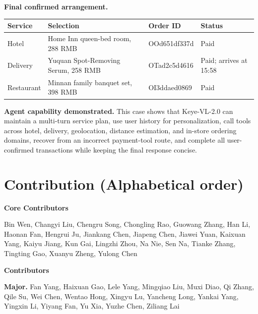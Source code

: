 \documentclass{llmxive}
\begin{document}
\begin{caseresponse}
\textbf{Final confirmed arrangement.}
\begin{center}
\begin{tabular}{llll}
\toprule
\textbf{Service} & \textbf{Selection} & \textbf{Order ID} & \textbf{Status} \\
\midrule
Hotel & Home Inn queen-bed room, 288 RMB & OOd651df337d & Paid \\
Delivery & Yuquan Spot-Removing Serum, 258 RMB & OTad2c5d4616 & Paid; arrives at 15:58 \\
Restaurant & Minnan family banquet set, 398 RMB & OI3ddaed0869 & Paid \\
\bottomrule
\end{tabular}
\end{center}

\textbf{Agent capability demonstrated.} This case shows that Keye-VL-2.0 can maintain a multi-turn service plan, use user history for personalization, call tools across hotel, delivery, geolocation, distance estimation, and in-store ordering domains, recover from an incorrect payment-tool route, and complete all user-confirmed transactions while keeping the final response concise.
\end{caseresponse}

\label{fig:multi_domain_service_agent_case}





\section{Contribution (Alphabetical order)}

\medskip
\noindent\textbf{Core Contributors}\par
\bigskip

Bin Wen, Changyi Liu, Chengru Song, Chongling Rao, Guowang Zhang,
Han Li, Haonan Fan, Hengrui Ju, Jiankang Chen, Jiapeng Chen,
Jiawei Yuan, Kaixuan Yang, Kaiyu Jiang, Kun Gai, Lingzhi Zhou,
Na Nie, Sen Na, Tianke Zhang, Tingting Gao, Xuanyu Zheng, Yulong Chen

\bigskip
\noindent\textbf{Contributors}\par
\bigskip

\textbf{Major.  }
Fan Yang, Haixuan Gao, Lele Yang, Mingqiao Liu, Muxi Diao, Qi Zhang,
Qile Su, Wei Chen, Wentao Hong, Xingyu Lu, Yancheng Long,
Yankai Yang, Yingxin Li, Yiyang Fan, Yu Xia, Yuzhe Chen, Ziliang Lai
\end{document}
